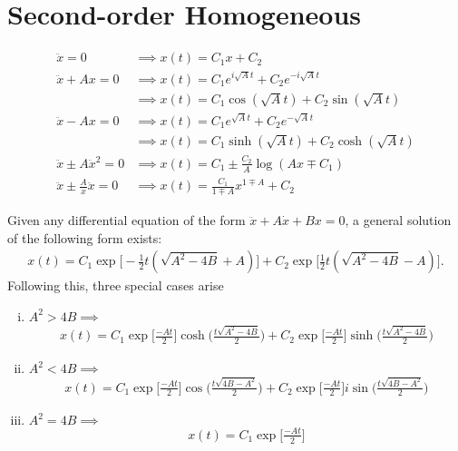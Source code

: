 \newpage
\section{Second-order Homogeneous}
\begin{align}
	\ddot{x}=0 &\implies x(t)=C_1x+C_2 \\
	\ddot{x}+Ax=0 &\implies x(t)=C_1e^{i\sqrt{A}t}+C_2e^{-i\sqrt{A}t} \\ &\implies x(t)=C_1\cos(\sqrt{A}t)+C_2\sin(\sqrt{A}t) \\
	\ddot{x}-Ax=0 &\implies x(t)=C_1e^{\sqrt{A}t}+C_2e^{-\sqrt{A}t} \\
	&\implies x(t)=C_1\sinh(\sqrt{A}t)+C_2\cosh(\sqrt{A}t) \\
	\ddot{x}\pm A \ddot{x}^2=0 &\implies x(t) = C_1\pm\frac{C_2}{A}\log(Ax\mp C_1) \\
	\ddot{x}\pm \frac{A}{x} \ddot{x}=0 &\implies x(t) = \frac{C_1}{1\mp A}x^{1\mp A}+C_2
\end{align} 



\begin{fancybox}[$\ddot{x}+A\dot{x}+Bx =0$]{}
Given any differential equation of the form $\ddot{x}+A\dot{x}+Bx =0$, a general solution of the following form exists:
\begin{align}
x(t)=C_1\exp\bigg[-\frac{1}{2}t(\sqrt{A^2-4B}+A)\bigg] +C_2\exp\bigg[\frac{1}{2}t(\sqrt{A^2-4B}-A)\bigg].
\end{align}
Following this, three special cases arise
\begin{enumerate}[(i)]
	\item $A^2>4B \implies$
	\begin{align}
	x(t)=C_1\exp\bigg[\frac{-At}{2}\bigg]\cosh\bigg(\frac{t\sqrt{A^2-4B}}{2} \bigg) +C_2\exp\bigg[\frac{-At}{2}\bigg]\sinh\bigg(\frac{t\sqrt{A^2-4B}}{2} \bigg)
	\end{align}
	\item $A^2<4B \implies$
	\begin{align}
	x(t)=C_1\exp\bigg[\frac{-At}{2}\bigg]\cos\bigg(\frac{t\sqrt{4B-A^2}}{2} \bigg) +C_2\exp\bigg[\frac{-At}{2}\bigg]i\sin\bigg(\frac{t\sqrt{4B-A^2}}{2} \bigg)	
	\end{align}
	\item $A^2=4B \implies $
	\begin{align}
	x(t)=C_1\exp\bigg[\frac{-At}{2}\bigg]
	\end{align}
\end{enumerate}
\end{fancybox}













